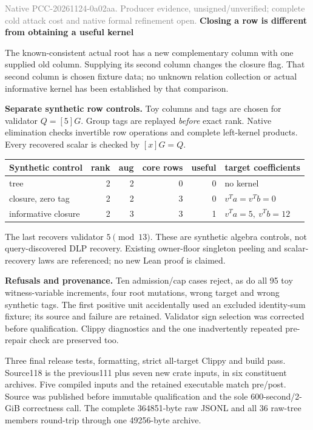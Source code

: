 \documentclass[10pt]{article}
\begin{document}
\textcolor{gray}{\footnotesize Native PCC-20261124-0a02aa. Producer evidence,
unsigned/unverified; complete cold attack cost and native formal refinement open.}
\newpage
{\Large\bf Closing a row is different from obtaining a useful kernel}

The known-consistent actual root has a new complementary column with one
supplied old column. Supplying its second column changes the closure flag.
That second column is chosen fixture data; no unknown relation collection
or actual informative kernel has been established by that comparison.

\textbf{Separate synthetic row controls.} Toy columns and tags are chosen
for validator $Q=[5]G$. Group tags are replayed \emph{before} exact rank.
Native elimination checks invertible row operations and complete left-kernel
products. Every recovered scalar is checked by $[x]G=Q$.
\begin{center}\small
\begin{tabular}{lrrrrl}\toprule
Synthetic control & rank & aug & core rows & useful & target coefficients\\\midrule
tree & 2 & 2 & 0 & 0 & no kernel\\
closure, zero tag & 2 & 2 & 3 & 0 & $v^Ta=v^Tb=0$\\
informative closure & 2 & 3 & 3 & 1 & $v^Ta=5,\ v^Tb=12$\\\bottomrule
\end{tabular}\end{center}
The last recovers validator $5\pmod {13}$. These are synthetic algebra
controls, not query-discovered DLP recovery. Existing owner-floor singleton
peeling and scalar-recovery laws are referenced; no new Lean proof is claimed.

\textbf{Refusals and provenance.} Ten admission/cap cases reject, as do all
95 toy witness-variable increments, four root mutations, wrong target and
wrong synthetic tags. The first positive unit accidentally used an excluded
identity-sum fixture; its source and failure are retained. Validator sign
selection was corrected before qualification. Clippy diagnostics and the
one inadvertently repeated pre-repair check are preserved too.

Three final release tests, formatting, strict all-target Clippy and build
pass. Source118 is the previous111 plus seven new crate inputs, in six
constituent archives. Five compiled inputs and the retained executable match
pre/post. Source was published before immutable qualification and the sole
600-second/2-GiB correctness call. The complete 364851-byte raw JSONL and all
36 raw-tree members round-trip through one 49256-byte archive.
\end{document}
